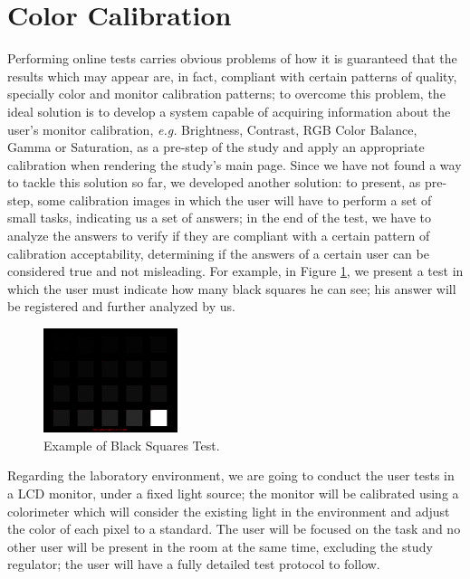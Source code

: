 \documentclass{report}
\begin{document}
\section{Color Calibration}
Performing online tests carries obvious problems of how it is guaranteed that the results which may appear are, in fact, compliant with certain patterns of
quality, specially color and monitor calibration patterns; to overcome this problem, the ideal solution is to develop a system capable of acquiring
information about the user's monitor calibration, \emph{e.g.} Brightness, Contrast, RGB Color Balance, Gamma or Saturation, as a pre-step of the study
and apply an appropriate calibration when rendering the study's main page. Since we have not found a way to tackle this solution so far, we developed
another solution: to present, as pre-step, some calibration images in which the user will have to perform a set of small tasks, indicating us
a set of answers; in the end of the test, we have to analyze the answers to verify if they are compliant with a certain pattern of calibration
acceptability, determining if the answers of a certain user can be considered true and not misleading. For example, in Figure \ref{fig:blacktest}, we present a test in which the user must indicate how many black squares he can see; his answer will be registered and further analyzed by us. \par
%
\begin{figure}
	\centering
    \vspace{-\baselineskip}
    \includegraphics[width=0.35\textwidth]{blacktest.png}
    \caption[Black Squares Test]{Example of Black Squares Test.\protect\footnotemark{}}
    \label{fig:blacktest}
\end{figure}
%
Regarding the laboratory environment, we are going to conduct the user tests in a LCD monitor, under a fixed light source; the monitor will be calibrated
using a colorimeter which will consider the existing light in the environment and adjust the color of each pixel to a standard. The user will be focused on
the task and no other user will be present in the room at the same time, excluding the study regulator; the user will have a fully detailed test protocol to
follow.
%
\end{document}
